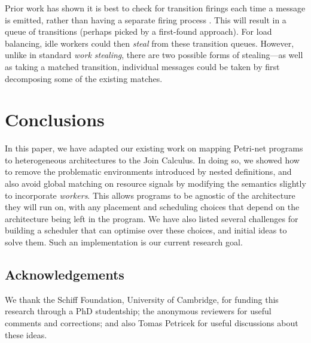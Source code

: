 \documentclass{eptcs}
\begin{document}
Prior work has shown it is best to check for transition firings each time a
message is emitted, rather than having a separate firing process
\cite{Turon2011}.  This will result in a queue of transitions (perhaps picked
by a first-found approach). For load balancing, idle workers could then {\em steal}
from these transition queues.  However, unlike in standard {\em work stealing},
there are two possible forms of stealing---as well as taking a matched transition, individual messages could be taken by first decomposing some of the existing matches.

\section{Conclusions}\label{sec:conclusion}
In this paper, we have adapted our existing work on mapping Petri-net programs
to heterogeneous architectures to the Join Calculus.  In doing so, we showed how
to remove the problematic environments introduced by nested definitions, and
also avoid global matching on resource signals by modifying the semantics slightly to incorporate {\em workers}.
This allows programs to be agnostic of the architecture they will run on, with any placement and scheduling choices that depend on the architecture being left in the program.
We have also listed several challenges for building a scheduler that can optimise over these choices, and initial ideas to solve them.
Such an implementation is our current research goal.

\subsection*{Acknowledgements}
We thank the Schiff Foundation, University of Cambridge, for funding this
research through a PhD studentship; the anonymous reviewers for useful comments
and corrections; and also Tomas Petricek for useful discussions about these
ideas.




\end{document}
